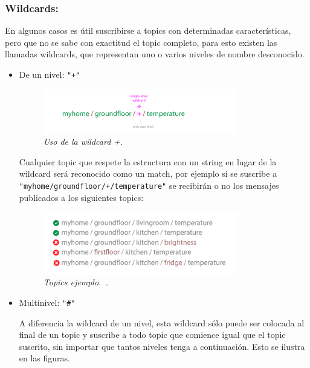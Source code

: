 \subsubsection{Wildcards:}

En algunos casos es útil suscribirse a topics con determinadas características, pero que no se sabe con exactitud el topic completo, para esto existen las llamadas wildcards, que representan uno o varios niveles de nombre desconocido.

\begin{itemize}

\item De un nivel: \lstinline[columns=fixed]{"+"} ~

\begin{figure}[h!]
  \centering
  \includegraphics[width=0.8\textwidth, keepaspectratio]{images/topic-wildcard-plus}
  \caption{\textit{Uso de la wildcard +. ~\cite{MQTTEssentials5}}}
  \label{fig:topic-wildcard-plus}
\end{figure}

Cualquier topic que respete la estructura con un string en lugar de la wildcard será reconocido como un match, por ejemplo si se suscribe a \lstinline[columns=fixed]{"myhome/groundfloor/+/temperature"} se recibirán o no los mensajes publicados a los siguientes topics:

\begin{figure}[h!]
  \centering
  \includegraphics[width=0.8\textwidth, keepaspectratio]{images/topic-wildcard-plus-example}
  \caption{\textit{Topics ejemplo.~\cite{MQTTEssentials5}.}}
  \label{fig:topic-wildcard-plus-example}
\end{figure}

\item Multinivel: \lstinline[columns=fixed]{"#"}

A diferencia la wildcard de un nivel, esta wildcard sólo puede ser colocada al final de un topic y suscribe a todo topic que comience igual que el topic suscrito, sin importar que tantos niveles tenga a continuación. Esto se ilustra en las figuras. ~


\end{itemize}
